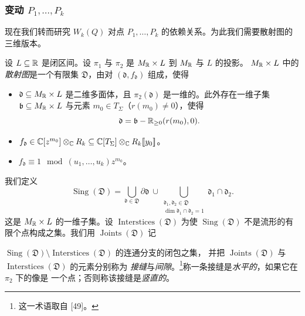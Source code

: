 \subsubsection{变动 $P_1,\ldots,P_k$}
现在我们转而研究 $W_k(Q)$ 对点 $P_1,\dots,P_k$ 的依赖关系。为此我们需要散射图的三维版本。

\begin{definition}
设 $L\subseteq\mathbb{R}$ 是闭区间。设 $\pi_1$ 与 $\pi_2$ 是 $M_{\mathbb{R}}\times L$ 到 $M_{\mathbb{R}}$ 与 $L$ 的投影。
$M_{\mathbb{R}}\times L$ 中的\emph{散射图}是一个有限集 $\mathfrak D$，由对 $(\mathfrak d,f_{\mathfrak d})$ 组成，使得
\begin{itemize}[leftmargin=*]
\item $\mathfrak d\subseteq M_{\mathbb{R}}\times L$ 是二维多面体，且 $\pi_2(\mathfrak d)$ 是一维的。此外存在一维子集
$\mathfrak b\subseteq M_{\mathbb{R}}\times L$ 与元素 $m_0\in T_\Sigma$（$r(m_0)\ne0$），使得
\[
\mathfrak d = \mathfrak b-\mathbb{R}_{\ge0}(r(m_0),0).
\]
\item $f_{\mathfrak d}\in\mathbb{C}[z^{m_0}]\otimes_{\mathbb{C}} R_k\subseteq\mathbb{C}[T_\Sigma]\otimes_{\mathbb{C}} R_k[\![y_0]\!]$。
\item $f_{\mathfrak d}\equiv1\mod(u_1,\dots,u_k)z^{m_0}$。
\end{itemize}
我们定义
\[
\operatorname{Sing}(\mathfrak D) = \bigcup_{\mathfrak d\in\mathfrak D}\partial\mathfrak d
\ \cup\bigcup_{\substack{\mathfrak d_1,\mathfrak d_2\in\mathfrak D\\ \dim\mathfrak d_1\cap\mathfrak d_2=1}}
\mathfrak d_1\cap\mathfrak d_2.
\]
这是 $M_{\mathbb{R}}\times L$ 的一维子集。设 $\operatorname{Interstices}(\mathfrak D)$ 为使
$\operatorname{Sing}(\mathfrak D)$ 不是流形的有限个点构成之集。我们用
$\operatorname{Joints}(\mathfrak D)$ 记

$\operatorname{Sing}(\mathfrak D)\setminus\operatorname{Interstices}(\mathfrak D)$ 的连通分支的闭包之集，
并把 $\operatorname{Joints}(\mathfrak D)$ 与 $\operatorname{Interstices}(\mathfrak D)$ 的元素分别称为
\emph{接缝}与\emph{间隙}。\footnote{这一术语取自 [49]。}称一条接缝是\emph{水平的}，如果它在 $\pi_2$ 下的像是
一个点；否则称该接缝是\emph{竖直的}。
\end{definition}


